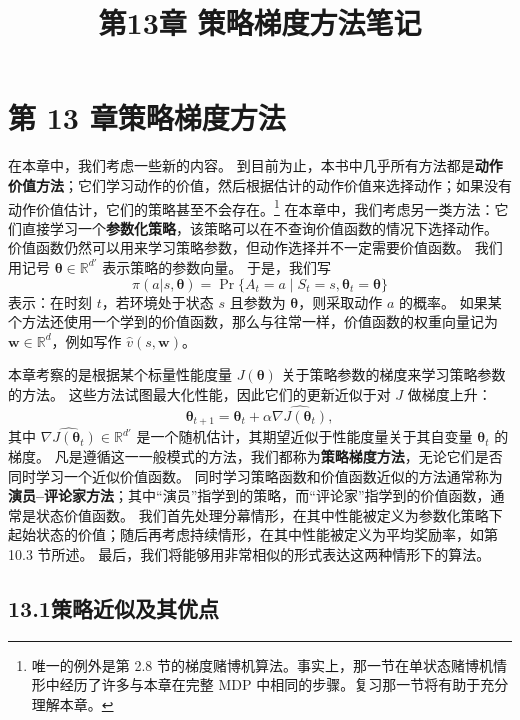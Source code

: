 \documentclass[UTF8,12pt,a4paper,fontset=fandol]{ctexart}
\title{第13章 策略梯度方法笔记}
\author{}
\date{}
\begin{document}
\maketitle

\section*{第 13 章\quad 策略梯度方法}

在本章中，我们考虑一些新的内容。
到目前为止，本书中几乎所有方法都是\textbf{动作价值方法}；它们学习动作的价值，然后根据估计的动作价值来选择动作；如果没有动作价值估计，它们的策略甚至不会存在。\footnote{唯一的例外是第 2.8 节的梯度赌博机算法。事实上，那一节在单状态赌博机情形中经历了许多与本章在完整 MDP 中相同的步骤。复习那一节将有助于充分理解本章。}
在本章中，我们考虑另一类方法：它们直接学习一个\textbf{参数化策略}，该策略可以在不查询价值函数的情况下选择动作。
价值函数仍然可以用来学习策略参数，但动作选择并不一定需要价值函数。
我们用记号 $\boldsymbol{\theta}\in\mathbb{R}^{d'}$ 表示策略的参数向量。
于是，我们写
\[
\pi(a|s,\boldsymbol{\theta})=\Pr\{A_t=a\mid S_t=s,\boldsymbol{\theta}_t=\boldsymbol{\theta}\}
\]
表示：在时刻 $t$，若环境处于状态 $s$ 且参数为 $\boldsymbol{\theta}$，则采取动作 $a$ 的概率。
如果某个方法还使用一个学到的价值函数，那么与往常一样，价值函数的权重向量记为 $\mathbf{w}\in\mathbb{R}^d$，例如写作 $\hat v(s,\mathbf{w})$。

本章考察的是根据某个标量性能度量 $J(\boldsymbol{\theta})$ 关于策略参数的梯度来学习策略参数的方法。
这些方法试图最大化性能，因此它们的更新近似于对 $J$ 做梯度上升：
\begin{equation}
\boldsymbol{\theta}_{t+1}=\boldsymbol{\theta}_t+\alpha \widehat{\nabla J(\boldsymbol{\theta}_t)},
\tag{13.1}
\end{equation}
其中 $\widehat{\nabla J(\boldsymbol{\theta}_t)}\in\mathbb{R}^{d'}$ 是一个随机估计，其期望近似于性能度量关于其自变量 $\boldsymbol{\theta}_t$ 的梯度。
凡是遵循这一一般模式的方法，我们都称为\textbf{策略梯度方法}，无论它们是否同时学习一个近似价值函数。
同时学习策略函数和价值函数近似的方法通常称为\textbf{演员--评论家方法}；其中“演员”指学到的策略，而“评论家”指学到的价值函数，通常是状态价值函数。
我们首先处理分幕情形，在其中性能被定义为参数化策略下起始状态的价值；随后再考虑持续情形，在其中性能被定义为平均奖励率，如第 10.3 节所述。
最后，我们将能够用非常相似的形式表达这两种情形下的算法。

\subsection*{13.1\quad 策略近似及其优点}
\end{document}
